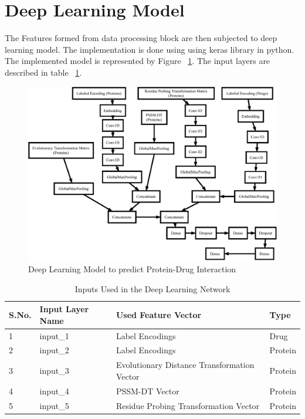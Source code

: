 
  \section{Deep Learning Model}
  
  The Features formed from data processing block are then subjected to deep learning model. The implementation is done using  using keras library in python. The implemented model is represented by Figure ~\ref{fig:dlm}. The input layers are described in table ~\ref{table:inputs}.
  
  \begin{figure}[H]
  \centering
  \includegraphics[width=1\linewidth]{mainmatter/3-Methodology/images/DeepDF_monchrome.pdf}
  \caption{Deep Learning Model to predict Protein-Drug Interaction}
  \label{fig:dlm}
  \end{figure}
  \begin{table}[H]\centering
    \caption{Inputs Used in the Deep Learning Network} 
    \begin{tabular}{|l|l|l|l|}
      \hline 
      S.No. & Input Layer Name & Used Feature Vector & Type \\ \hline
      1 & input\_1 & Label Encodings & Drug \\ \hline
      2 & input\_2 & Label Encodings & Protein \\ \hline
      3 & input\_3 & Evolutionary Distance Transformation Vector& Protein \\ \hline
      4 & input\_4 & PSSM-DT Vector & Protein \\ \hline
      5 & input\_5 & Residue Probing Transformation Vector & Protein \\   \hline 
    \end{tabular} 
    \label{table:inputs}
  \end{table}
  
